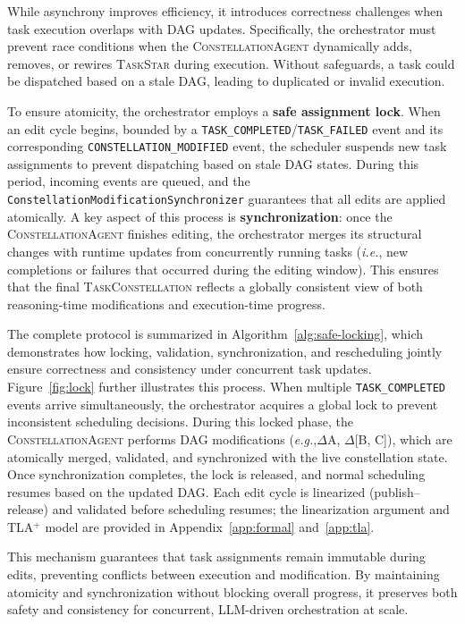 \documentclass[10pt]{article} %
\newcommand{\cagent}{\textsc{ConstellationAgent}\xspace}
\newcommand{\TaskConstellation}{\textsc{TaskConstellation}\xspace}
\newcommand{\TaskStar}{\textsc{TaskStar}\xspace}
\newcommand{\eg}{\textit{e.g.},\xspace}
\newcommand{\ie}{\textit{i.e.},\xspace}
\begin{document}
While asynchrony improves efficiency, it introduces correctness challenges when task execution overlaps with DAG updates. Specifically, the orchestrator must prevent race conditions when the \cagent dynamically adds, removes, or rewires \TaskStar during execution. Without safeguards, a task could be dispatched based on a stale DAG, leading to duplicated or invalid execution.

To ensure atomicity, the orchestrator employs a \textbf{safe assignment lock}. When an edit cycle begins, bounded by a \texttt{TASK\_COMPLETED}/\texttt{TASK\_FAILED} event and its corresponding \texttt{CONSTELLATION\_MODIFIED} event, the scheduler suspends new task assignments to prevent dispatching based on stale DAG states. During this period, incoming events are queued, and the \texttt{ConstellationModificationSynchronizer} guarantees that all edits are applied atomically. A key aspect of this process is \textbf{synchronization}: once the \cagent finishes editing, the orchestrator merges its structural changes with runtime updates from concurrently running tasks (\ie new completions or failures that occurred during the editing window). This ensures that the final \TaskConstellation reflects a globally consistent view of both reasoning-time modifications and execution-time progress. 

The complete protocol is summarized in Algorithm~\ref{alg:safe-locking}, which demonstrates how locking, validation, synchronization, and rescheduling jointly ensure correctness and consistency under concurrent task updates. Figure~\ref{fig:lock} further illustrates this process. When multiple \texttt{TASK\_COMPLETED} events arrive simultaneously, the orchestrator acquires a global lock to prevent inconsistent scheduling decisions. During this locked phase, the \cagent performs DAG modifications (\eg $\Delta$A, $\Delta$[B, C]), which are atomically merged, validated, and synchronized with the live constellation state. Once synchronization completes, the lock is released, and normal scheduling resumes based on the updated DAG. Each edit cycle is linearized (publish--release) and validated before scheduling resumes; the linearization argument and TLA$^{+}$ model are provided in Appendix~\ref{app:formal} and~\ref{app:tla}.

This mechanism guarantees that task assignments remain immutable during edits, preventing conflicts between execution and modification. By maintaining atomicity and synchronization without blocking overall progress, it preserves both safety and consistency for concurrent, LLM-driven orchestration at scale.
\end{document}
